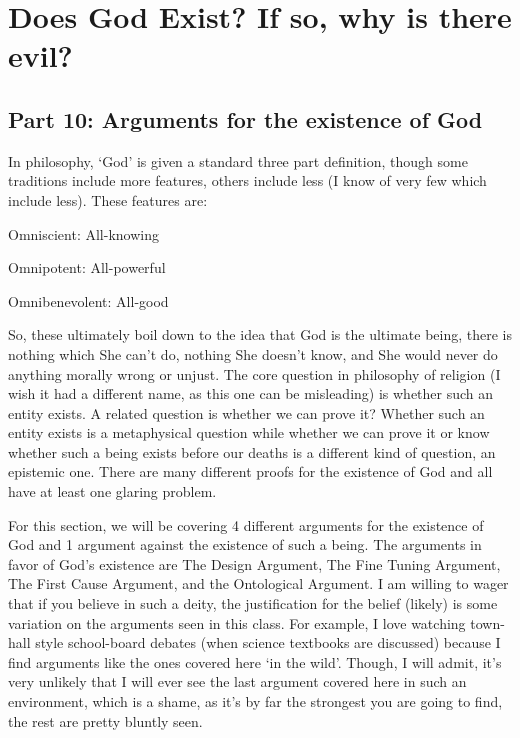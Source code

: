 \part{Does God Exist? If so, why is there evil?}
\label{ch.modfive}
\chapter{Part 10: Arguments for the existence of God}
In philosophy, ‘God’ is given a standard three part definition, though some traditions include more features, others include less (I know of very few which include less). These features are:
\begin{earg}
    \item[]Omniscient: All-knowing
    \item[]Omnipotent: All-powerful
    \item[]Omnibenevolent: All-good
\end{earg}
So, these ultimately boil down to the idea that God is the ultimate being, there is nothing which She can't do, nothing She doesn't know, and She would never do anything morally wrong or unjust. The core question in philosophy of religion (I wish it had a different name, as this one can be misleading) is whether such an entity exists. A related question is whether we can prove it? Whether such an entity exists is a metaphysical question while whether we can prove it or know whether such a being exists before our deaths is a different kind of question, an epistemic one. There are many different proofs for the existence of God and all have at least one glaring problem.

For this section, we will be covering 4 different arguments for the existence of God and 1 argument against the existence of such a being. The arguments in favor of God's existence are The Design Argument, The Fine Tuning Argument, The First Cause Argument, and the Ontological Argument. I am willing to wager that if you believe in such a deity, the justification for the belief (likely) is some variation on the arguments seen in this class. For example, I love watching town-hall style school-board debates (when science textbooks are discussed) because I find arguments like the ones covered here `in the wild'. Though, I will admit, it's very unlikely that I will ever see the last argument covered here in such an environment, which is a shame, as it's by far the strongest you are going to find, the rest are pretty bluntly seen.  

